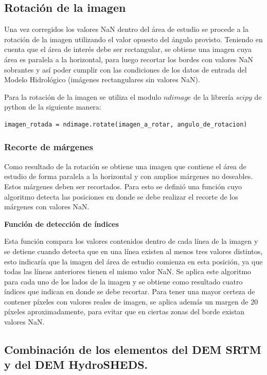 \documentclass[10pt,a4paper, twoside]{report}
\begin{document}
\subsection{Rotación de la imagen}

Una vez corregidos los valores NaN dentro del área de estudio se procede a la rotación de la imagen utilizando el valor opuesto del ángulo provisto. Teniendo en cuenta que el área de interés debe ser rectangular, se obtiene una imagen cuya área es paralela a la horizontal, para luego recortar los bordes con valores NaN sobrantes y así poder cumplir con las condiciones de los datos de entrada del Modelo Hidrológico (imágenes rectangulares sin valores NaN).

Para la rotación de la imagen se utiliza el modulo $ndimage$ de la librería $scipy$ de python de la siguiente manera:

\begin{lstlisting}
imagen_rotada = ndimage.rotate(imagen_a_rotar, angulo_de_rotacion)
\end{lstlisting}

\subsubsection{Recorte de márgenes}

Como resultado de la rotación se obtiene una imagen que contiene el área de estudio de forma paralela a la horizontal y con amplios márgenes no deseables. Estos márgenes deben ser recortados. Para esto se definió una función cuyo algoritmo detecta las posiciones en donde se debe realizar el recorte de los márgenes con valores NaN.

\textbf{Función de detección de índices}

Esta función compara los valores contenidos dentro de cada línea de la imagen y se detiene cuando detecta que en una línea existen al menos tres valores distintos, esto indicaría que la imagen del área de estudio comienza en esta posición, ya que todas las líneas anteriores tienen el mismo valor NaN. Se aplica este algoritmo para cada uno de los lados de la imagen y se obtiene como resultado cuatro índices que indican en donde se debe recortar. Para tener una mayor certeza de contener píxeles con valores reales de imagen, se aplica además un margen de 20 píxeles aproximadamente, para evitar que en ciertas zonas del borde existan valores NaN.



\subsection{Combinación de los elementos del DEM SRTM y del DEM HydroSHEDS.}
\end{document}
